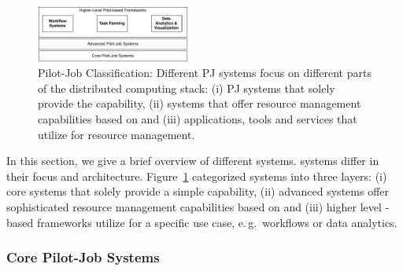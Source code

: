 \documentclass{sig-alternate}
\begin{document}

\begin{figure}[t]
	\centering
		\includegraphics[width=0.45\textwidth]{figures/classification}
	\caption{Pilot-Job Classification: Different PJ systems focus
          on different parts of the distributed computing stack: (i)
          PJ systems that solely provide the \pilot capability, (ii)
          systems that offer resource management capabilities based on
          \pilots and (iii) applications, tools and services that
          utilize \pilots for resource management. }  
	\label{fig:figures_classification}
\end{figure}

In this section, we give a brief overview of different \pilotjob systems.
\pilotjob systems differ in their focus and architecture.
Figure~\ref{fig:figures_classification} categorized \pilotjob systems into
three layers: (i) core \pilotjob systems that solely provide a simple \pilot
capability, (ii) advanced \pilotjob systems offer sophisticated resource
management capabilities based on \pilots and (iii) higher level \pilot-based
frameworks utilize \pilots for a specific use case, e.\,g.\ workflows or data
analytics.

\subsubsection{Core Pilot-Job Systems}

\end{document}
